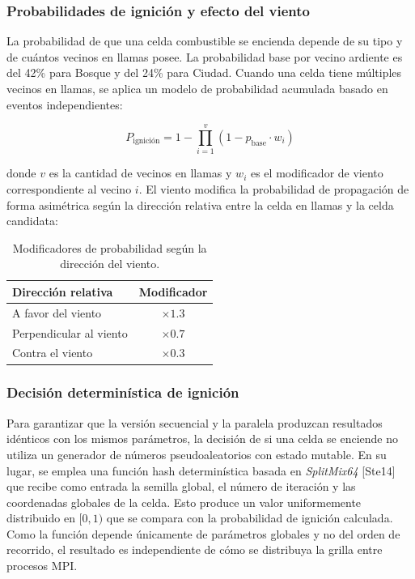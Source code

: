 \documentclass[10pt,a4paper]{article}
\begin{document}
\subsubsection{Probabilidades de ignición y efecto del viento}

La probabilidad de que una celda combustible se encienda depende de su tipo y de cuántos vecinos en llamas posee. La probabilidad base por vecino ardiente es del 42\% para Bosque y del 24\% para Ciudad. Cuando una celda tiene múltiples vecinos en llamas, se aplica un modelo de probabilidad acumulada basado en eventos independientes:

\begin{equation}
    P_{\text{ignición}} = 1 - \prod_{i=1}^{v} (1 - p_{\text{base}} \cdot w_{i})
\end{equation}

\noindent donde $v$ es la cantidad de vecinos en llamas y $w_{i}$ es el modificador de viento correspondiente al vecino $i$. El viento modifica la probabilidad de propagación de forma asimétrica según la dirección relativa entre la celda en llamas y la celda candidata:

\begin{table}[h]
\centering
\begin{tabular}{|l|c|}
\hline
\textbf{Dirección relativa} & \textbf{Modificador} \\ \hline
A favor del viento          & $\times 1.3$         \\ \hline
Perpendicular al viento     & $\times 0.7$         \\ \hline
Contra el viento            & $\times 0.3$         \\ \hline
\end{tabular}
\caption{Modificadores de probabilidad según la dirección del viento.}
\end{table}

\subsubsection{Decisión determinística de ignición}

Para garantizar que la versión secuencial y la paralela produzcan resultados idénticos con los mismos parámetros, la decisión de si una celda se enciende no utiliza un generador de números pseudoaleatorios con estado mutable. En su lugar, se emplea una función hash determinística basada en \textit{SplitMix64} [Ste14] que recibe como entrada la semilla global, el número de iteración y las coordenadas globales de la celda. Esto produce un valor uniformemente distribuido en $[0, 1)$ que se compara con la probabilidad de ignición calculada. Como la función depende únicamente de parámetros globales y no del orden de recorrido, el resultado es independiente de cómo se distribuya la grilla entre procesos MPI.
\end{document}
